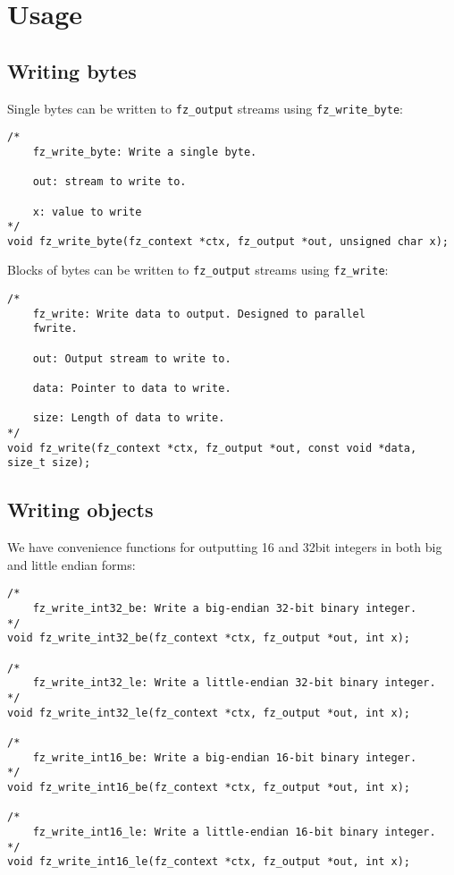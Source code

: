 \documentclass[oneside]{book}
\begin{document}
\section{Usage}

\subsection{Writing bytes}

Single bytes can be written to \texttt{fz\_output} streams using \texttt{fz\_write\_byte}:

\begin{lstlisting}
/*
	fz_write_byte: Write a single byte.

	out: stream to write to.

	x: value to write
*/
void fz_write_byte(fz_context *ctx, fz_output *out, unsigned char x);
\end{lstlisting}

Blocks of bytes can be written to \texttt{fz\_output} streams using \texttt{fz\_write}:

\begin{lstlisting}
/*
	fz_write: Write data to output. Designed to parallel
	fwrite.

	out: Output stream to write to.

	data: Pointer to data to write.

	size: Length of data to write.
*/
void fz_write(fz_context *ctx, fz_output *out, const void *data, size_t size);
\end{lstlisting}

\subsection{Writing objects}

We have convenience functions for outputting 16 and 32bit integers in both big and little endian forms:

\begin{lstlisting}
/*
	fz_write_int32_be: Write a big-endian 32-bit binary integer.
*/
void fz_write_int32_be(fz_context *ctx, fz_output *out, int x);

/*
	fz_write_int32_le: Write a little-endian 32-bit binary integer.
*/
void fz_write_int32_le(fz_context *ctx, fz_output *out, int x);

/*
	fz_write_int16_be: Write a big-endian 16-bit binary integer.
*/
void fz_write_int16_be(fz_context *ctx, fz_output *out, int x);

/*
	fz_write_int16_le: Write a little-endian 16-bit binary integer.
*/
void fz_write_int16_le(fz_context *ctx, fz_output *out, int x);
\end{lstlisting}
\end{document}
